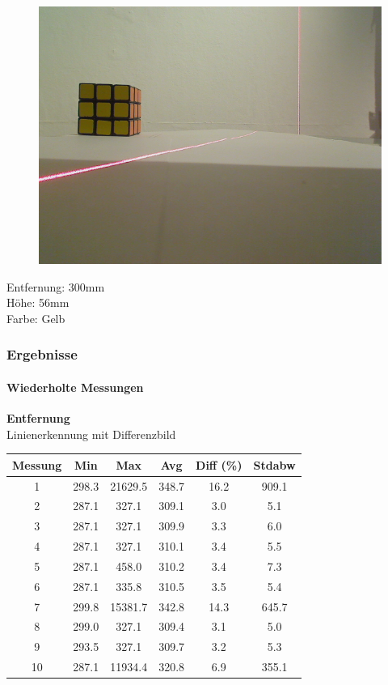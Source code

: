 \documentclass[xcolor=dvipsnames]{beamer}
\begin{document}
\begin{frame}
\begin{figure}
\begin{minipage}{0.32\linewidth}
		\end{minipage}
		\hfill
		\begin{minipage}{0.32\linewidth}
			\includegraphics[width=\linewidth]{includes/test_repeat_3}
		\end{minipage}
	\end{figure}
	
	Entfernung: 300mm\\
	Höhe: 56mm\\
	Farbe: Gelb

\end{frame}
	
\begin{frame}
	\frametitle{Ergebnisse}
	\framesubtitle{Wiederholte Messungen}
		\textbf{Entfernung}\\
	
		Linienerkennung mit Differenzbild
		\begin{tabular}{c|c|c|c|c|c}
			Messung & Min & Max & Avg & Diff (\%) & Stdabw \\ \hline
1 & 298.3 & 21629.5 & 348.7 & 16.2 & 909.1 \\
2 & 287.1 & 327.1 & 309.1 & 3.0 & 5.1 \\
3 & 287.1 & 327.1 & 309.9 & 3.3 & 6.0 \\
4 & 287.1 & 327.1 & 310.1 & 3.4 & 5.5 \\
5 & 287.1 & 458.0 & 310.2 & 3.4 & 7.3 \\
6 & 287.1 & 335.8 & 310.5 & 3.5 & 5.4 \\
7 & 299.8 & 15381.7 & 342.8 & 14.3 & 645.7 \\
8 & 299.0 & 327.1 & 309.4 & 3.1 & 5.0 \\
9 & 293.5 & 327.1 & 309.7 & 3.2 & 5.3 \\
10 & 287.1 & 11934.4 & 320.8 & 6.9 & 355.1
		\end{tabular}
		
\end{frame}
	
\end{document}
